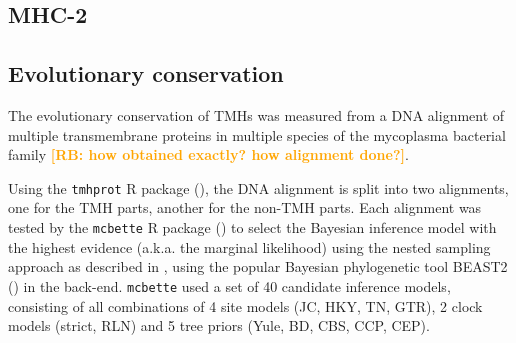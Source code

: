 \documentclass{article}
\newcommand{\richel}[1]{\textcolor{orange}{\textbf{[RB: #1]}}}
\begin{document}
\subsection{MHC-2}

\subsection{Evolutionary conservation}

\iffalse
	The evolutionary conservation of TMHs was measured from a
	DNA alignment of multiple transmembrane proteins in multiple
	species of the mycoplasma bacterial family
	\richel{how obtained exactly? how alignment done?}.

	Using the \verb;tmhprot; R package (\cite{tmhprot}), the DNA alignment is split
	into two alignments, one for the TMH parts, another for the non-TMH
	parts. Each alignment was tested by the \verb;mcbette; 
	R package (\cite{mcbette}) to select the Bayesian inference model with
	the highest evidence (a.k.a. the marginal likelihood) using the nested
	sampling approach as described in \cite{maturana2018model},
	using the popular Bayesian phylogenetic tool 
	BEAST2 (\cite{bouckaert2014beast}) in the back-end.
	\verb;mcbette; used a set of 40 candidate inference models, 
	consisting of all combinations of 
	4 site models (JC, HKY, TN, GTR), 
	2 clock models (strict, RLN) and 
	5 tree priors (Yule, BD, CBS, CCP, CEP).
\end{document}

